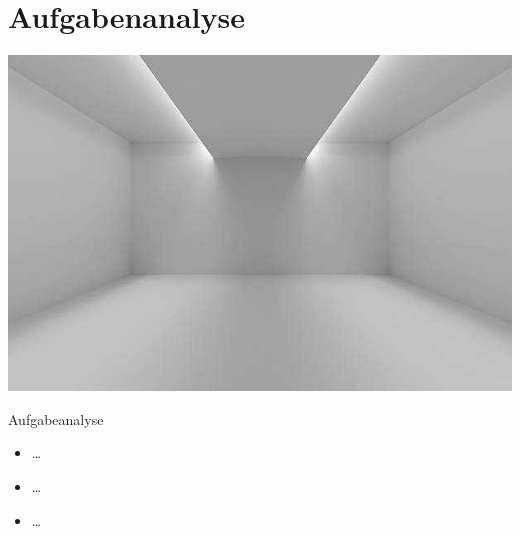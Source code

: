\documentclass[presentation,bigger,aspectratio=169]{beamer}
\begin{document}
\section{Aufgabenanalyse}
\label{sec:org23abefd}
\begin{frame}[label={sec:org9b945b1}]{\MakeUppercase{\insertsection}}
\begin{center}
\begin{center}
\includegraphics[height=0.77\textheight]{./img/m1_praes_empty_01.jpg}
\label{fig:m1_praes_empty_01}
\end{center}
\end{center}
\end{frame}
\begin{frame}[label={sec:org6a7b6d0}]{Aufgabeanalyse}
\begin{itemize}
\item \ldots{}
\item \ldots{}
\item \ldots{}
\end{itemize}
\end{frame}
\end{document}
